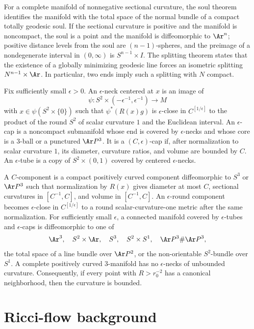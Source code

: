 For a complete manifold of nonnegative sectional curvature, the soul theorem
identifies the manifold with the total space of the normal bundle of a compact
totally geodesic soul. If the sectional curvature is positive and the manifold
is noncompact, the soul is a point and the manifold is diffeomorphic to
$\Ar^n$; positive distance levels from the soul are $(n-1)$-spheres, and the
preimage of a nondegenerate interval in $(0,\infty)$ is
$S^{n-1}\times I$. The splitting theorem states that the existence of a
globally minimizing geodesic line forces an isometric splitting
$N^{n-1}\times\Ar$. In particular, two ends imply such a splitting with $N$
compact.

Fix sufficiently small $\epsilon>0$. An $\epsilon$-neck centered at $x$ is an
image of
\[
  \psi:S^2\times(-\epsilon^{-1},\epsilon^{-1})\longrightarrow M
\]
with $x\in\psi(S^2\times\{0\})$ such that
$\psi^*(R(x)g)$ is $\epsilon$-close in $C^{[1/\epsilon]}$ to the product of
the round $S^2$ of scalar curvature $1$ and the Euclidean interval. An
$\epsilon$-cap is a noncompact submanifold whose end is covered by
$\epsilon$-necks and whose core is a $3$-ball or a punctured $\Ar P^3$. It is
a $(C,\epsilon)$-cap if, after normalization to scalar curvature $1$, its
diameter, curvature ratios, and volume are bounded by $C$. An
$\epsilon$-tube is a copy of $S^2\times(0,1)$ covered by centered
$\epsilon$-necks.

A $C$-component is a compact positively curved component diffeomorphic to
$S^3$ or $\Ar P^3$ such that normalization by $R(x)$ gives diameter at most
$C$, sectional curvatures in $[C^{-1},C]$, and volume in $[C^{-1},C]$. An
$\epsilon$-round component becomes $\epsilon$-close in
$C^{[1/\epsilon]}$ to a round scalar-curvature-one metric after the same
normalization. For sufficiently small $\epsilon$, a connected manifold
covered by $\epsilon$-tubes and $\epsilon$-caps is diffeomorphic to one of
\[
\Ar^3,\quad S^2\times\Ar,\quad S^3,\quad S^2\times S^1,\quad
\Ar P^3\#\Ar P^3,
\]
the total space of a line bundle over $\Ar P^2$, or the non-orientable
$S^2$-bundle over $S^1$. A complete positively curved $3$-manifold has no
$\epsilon$-necks of unbounded curvature. Consequently, if every point with
$R>r_0^{-2}$ has a canonical neighborhood, then the curvature is bounded.

\section{Ricci-flow background}

